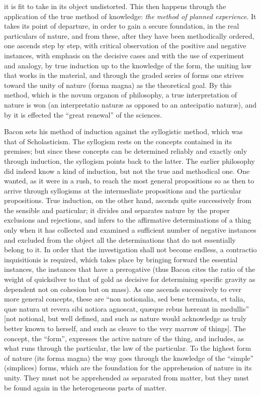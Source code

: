 it is fit to take in its object undistorted. This
then happens through the application of the true method of knowledge:
\emph{the method of planned experience}. It takes its point of departure,
in order to gain a secure foundation, in the real particulars of nature,
and from these, after they have been methodically
ordered, one ascends step by step, with critical observation of the positive and negative instances, with emphasis on the decisive cases and with the use of experiment and analogy, by true induction up to the knowledge of the form, the uniting law that works in the material, and through
the graded series of forms one strives toward the unity of nature
(forma magna) as the theoretical goal. By this method,
which is the novum organon of philosophy, a true interpretation of nature is won (an interpretatio naturæ as opposed to an
antecipatio naturæ), and by it is effected the ``great
renewal'' of the sciences.

Bacon sets his method of induction against the syllogistic
method, which was that of Scholasticism. The syllogism rests on the
concepts contained in its premises; but since these
concepts can be determined reliably and exactly only through induction, the syllogism points back to the latter. The
earlier philosophy did indeed know a kind of induction, but
not the true and methodical one. One wanted, as it were in a rush,
to reach the most general propositions so as then to
arrive through syllogisms at the intermediate propositions and the particular propositions.
True induction, on the other hand, ascends quite successively from
the sensible and particular; it divides and separates nature
by the proper exclusions and rejections, and infers to
the affirmative determinations of a thing only when it has collected and
examined a sufficient number of negative instances and
excluded from the object all the determinations that do not
essentially belong to it. In order that the investigation shall not become
endless, a contractio inquisitionis is required, which takes place by
bringing forward the essential instances, the instances that have a
prerogative (thus Bacon cites the ratio of the weight of quicksilver to
that of gold as decisive for determining specific
gravity as dependent not on cohesion but on mass).
As one ascends successively to ever more general concepts, these are ``non notionalia, sed bene terminata, et
talia, quæ natura ut revera sibi notiora agnoscat, quæque
rebus hæreant in medullis'' [not notional, but well defined, and such as nature would acknowledge as truly better known to herself, and such as cleave to the very marrow of things]. The concept, the ``form'', expresses
the active nature of the thing, and includes, as what runs through the particular, the law of the particular. To the highest
form of nature (its forma magna) the way goes through the knowledge
of the ``simple'' (simplices) forms, which are the foundation for the apprehension of nature in its unity. They must not be apprehended as
separated from matter, but they must be found again in the heterogeneous parts of matter.

